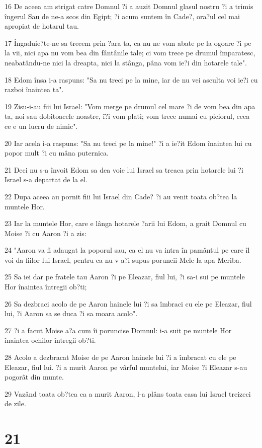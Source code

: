 \par 16 De aceea am strigat catre Domnul ?i a auzit Domnul glasul nostru ?i a trimis îngerul Sau de ne-a scos din Egipt; ?i acum suntem în Cade?, ora?ul cel mai apropiat de hotarul tau.
\par 17 Îngaduie?te-ne sa trecem prin ?ara ta, ca nu ne vom abate pe la ogoare ?i pe la vii, nici apa nu vom bea din fântânile tale; ci vom trece pe drumul împaratesc, neabatându-ne nici la dreapta, nici la stânga, pâna vom ie?i din hotarele tale".
\par 18 Edom însa i-a raspuns: "Sa nu treci pe la mine, iar de nu vei asculta voi ie?i cu razboi înaintea ta".
\par 19 Zisu-i-au fiii lui Israel: "Vom merge pe drumul cel mare ?i de vom bea din apa ta, noi sau dobitoacele noastre, î?i vom plati; vom trece numai cu piciorul, ceea ce e un lucru de nimic".
\par 20 Iar acela i-a raspuns: "Sa nu treci pe la mine!" ?i a ie?it Edom înaintea lui cu popor mult ?i cu mâna puternica.
\par 21 Deci nu s-a învoit Edom sa dea voie lui Israel sa treaca prin hotarele lui ?i Israel s-a departat de la el.
\par 22 Dupa aceea au pornit fiii lui Israel din Cade? ?i au venit toata ob?tea la muntele Hor.
\par 23 Iar la muntele Hor, care e lânga hotarele ?arii lui Edom, a grait Domnul cu Moise ?i cu Aaron ?i a zis:
\par 24 "Aaron va fi adaugat la poporul sau, ca el nu va intra în pamântul pe care îl voi da fiilor lui Israel, pentru ca nu v-a?i supus poruncii Mele la apa Meriba.
\par 25 Sa iei dar pe fratele tau Aaron ?i pe Eleazar, fiul lui, ?i sa-i sui pe muntele Hor înaintea întregii ob?ti;
\par 26 Sa dezbraci acolo de pe Aaron hainele lui ?i sa îmbraci cu ele pe Eleazar, fiul lui, ?i Aaron sa se duca ?i sa moara acolo".
\par 27 ?i a facut Moise a?a cum îi poruncise Domnul: i-a suit pe muntele Hor înaintea ochilor întregii ob?ti.
\par 28 Acolo a dezbracat Moise de pe Aaron hainele lui ?i a îmbracat cu ele pe Eleazar, fiul lui. ?i a murit Aaron pe vârful muntelui, iar Moise ?i Eleazar s-au pogorât din munte.
\par 29 Vazând toata ob?tea ca a murit Aaron, l-a plâns toata casa lui Israel treizeci de zile.

\chapter{21}


